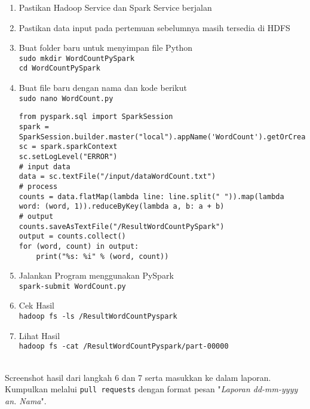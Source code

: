 \documentclass[a4paper]{tufte-handout}
\begin{document}
\begin{enumerate}
\item Pastikan Hadoop Service dan Spark Service berjalan
\item Pastikan data input pada pertemuan sebelumnya masih tersedia di HDFS
\item Buat folder baru untuk menyimpan file Python \\
{\tt sudo mkdir WordCountPySpark} \\
{\tt cd WordCountPySpark}

\item Buat file baru dengan nama dan kode berikut \\
{\tt sudo nano WordCount.py}
\begin{lstlisting}
from pyspark.sql import SparkSession
spark = SparkSession.builder.master("local").appName('WordCount').getOrCreate()
sc = spark.sparkContext
sc.setLogLevel("ERROR")
# input data
data = sc.textFile("/input/dataWordCount.txt")
# process
counts = data.flatMap(lambda line: line.split(" ")).map(lambda word: (word, 1)).reduceByKey(lambda a, b: a + b)
# output
counts.saveAsTextFile("/ResultWordCountPySpark")
output = counts.collect()
for (word, count) in output:
    print("%s: %i" % (word, count))
\end{lstlisting}

\item Jalankan Program menggunakan PySpark \\
{\tt spark-submit WordCount.py}

\item Cek Hasil \\
{\tt hadoop fs -ls /ResultWordCountPyspark}

\item Lihat Hasil \\
{\tt hadoop fs -cat /ResultWordCountPyspark/part-00000}
\end{enumerate}

\vspace*{-.5cm}
 \\
Screenshot hasil dari langkah 6 dan 7 serta masukkan ke dalam laporan. Kumpulkan melalui {\tt pull requests} dengan format pesan "\textit{Laporan dd-mm-yyyy an. Nama}".

\hrulefill

\clearpage
{}

\end{document}
